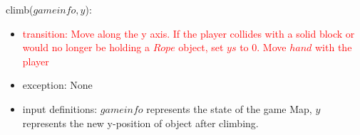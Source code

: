 \documentclass[12pt]{article}
\begin{document}
\noindent
climb($gameinfo, y$):
\begin{itemize}
    \item \textcolor{red}{transition: Move along the y axis. If the player collides with a solid block or would no longer be holding a $Rope$ object, set $ys$ to 0. Move $hand$ with the player}
    \item exception: None
    \item input definitions: $gameinfo$ represents the state of the game Map, $y$ represents the new y-position of object after climbing.
\end{itemize}
\end{document}
